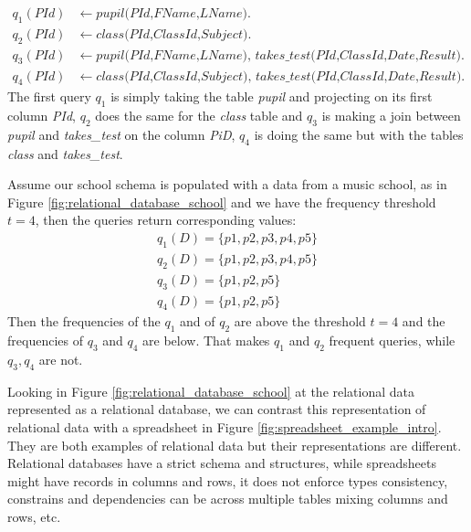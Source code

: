 \begin{equation*}
\begin{aligned}
q_1(\textit{PId})&\leftarrow \textit{pupil(PId,FName,LName)}.\\
q_2(\textit{PId})&\leftarrow \textit{class(PId,ClassId,Subject)}. \\
q_3(\textit{PId})&\leftarrow \textit{pupil(PId,FName,LName), takes\_test(PId,ClassId,Date,Result)}.\\
q_4(\textit{PId})&\leftarrow \textit{class(PId,ClassId,Subject), takes\_test(PId,ClassId,Date,Result)}.
\end{aligned}
\end{equation*}
The first query $q_1$ is simply taking the table \textit{pupil} and projecting
on its first column \textit{PId}, $q_2$ does the same for the
\textit{class} table and $q_3$ is making a join between \textit{pupil}
and \textit{takes\_test} on the column \textit{PiD}, $q_4$ is doing the same
but with the tables \textit{class} and \textit{takes\_test}.

Assume our school schema is populated with a data from a music school,
as in Figure \ref{fig:relational_database_school} and we have the
frequency threshold $t=4$, then the queries return corresponding
values:
\begin{equation*}
\begin{aligned}
    q_1(D) = \{ p1, p2, p3, p4, p5 \} \\
    q_2(D) = \{ p1, p2, p3, p4, p5 \} \\
    q_3(D) = \{ p1, p2, p5 \} \\
    q_4(D) = \{ p1, p2, p5 \} 
\end{aligned}
\end{equation*}
Then the frequencies of the $q_1$ and of $q_2$ are above the threshold $t=4$
and the frequencies of $q_3$ and $q_4$ are below. That makes $q_1$ and
$q_2$ frequent queries, while $q_3,q_4$ are not.

Looking in Figure
\ref{fig:relational_database_school} at the relational data represented
as a relational database, we can contrast this representation of
relational data with a spreadsheet in Figure
\ref{fig:spreadsheet_example_intro}. They are both examples of
relational data but their representations are different. 
Relational databases have a strict schema and structures, while
spreadsheets might have records in columns and rows, it does not
enforce types consistency, constrains and dependencies can be across
multiple tables mixing columns and rows, etc.

